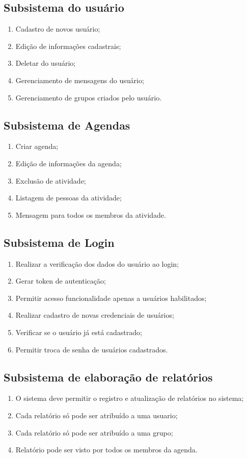 \subsection{Subsistema do usuário}
\begin{enumerate}
  \item Cadastro de novos usuário;
  \item Edição de informações cadastrais;
  \item Deletar do usuário;
  \item Gerenciamento de mensagens do usuário;
  \item Gerenciamento de grupos criados pelo usuário.
\end{enumerate}
\subsection{Subsistema de Agendas}
\begin{enumerate}
  \item Criar agenda;
  \item Edição de informações da agenda;
  \item Exclusão de atividade;
  \item Listagem de pessoas da atividade;
  \item Mensagem para todos os membros da atividade.
\end{enumerate}

\subsection{Subsistema de Login}
\begin{enumerate}
  \item Realizar a verificação dos dados do usuário ao login;
  \item Gerar token de autenticação;
  \item Permitir acesso funcionalidade apenas a usuários habilitados;
  \item Realizar cadastro de novas credenciais de usuários;
  \item Verificar se o usuário já está cadastrado;
  \item Permitir troca de senha de usuários cadastrados.

\end{enumerate}

\subsection{Subsistema de elaboração de relatórios}
\begin{enumerate}
  \item O sistema deve permitir o registro e atualização de relatórios no sistema;
  \item Cada relatório só pode ser atribuído a uma usuario;
  \item Cada relatório só pode ser atribuído a uma grupo;
  \item Relatório pode ser visto por todos os membros da agenda.

\end{enumerate}

